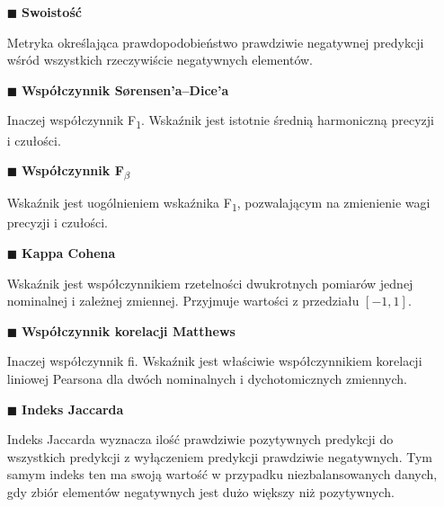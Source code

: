 \begin{itemize}
    \item[$\blacksquare$] \textbf{Swoistość} 
    \par Metryka określająca prawdopodobieństwo prawdziwie negatywnej predykcji wśród wszystkich rzeczywiście negatywnych elementów.
    \par
    
    \item[$\blacksquare$] \textbf{Współczynnik Sørensen'a–Dice'a}
    \par Inaczej współczynnik F\textsubscript{1}. Wskaźnik jest istotnie średnią harmoniczną precyzji i czułości.  
    \par

    \item[$\blacksquare$] \textbf{Współczynnik F\textsubscript{$\beta$}}
    \par Wskaźnik jest uogólnieniem wskaźnika F\textsubscript{1}, pozwalającym na zmienienie wagi precyzji i czułości.
    \par

    \item[$\blacksquare$] \textbf{Kappa Cohena}
    \par Wskaźnik jest współczynnikiem rzetelności dwukrotnych pomiarów jednej nominalnej i zależnej zmiennej. Przyjmuje wartości z przedziału $[-1,1]$.
    \par

    \item[$\blacksquare$] \textbf{Współczynnik korelacji Matthews} 
    \par Inaczej współczynnik fi. Wskaźnik jest właściwie współczynnikiem korelacji liniowej Pearsona dla dwóch nominalnych i dychotomicznych zmiennych. 
    \par

    \item[$\blacksquare$] \textbf{Indeks Jaccarda}
    \par Indeks Jaccarda wyznacza ilość prawdziwie pozytywnych predykcji do wszystkich predykcji z wyłączeniem predykcji prawdziwie negatywnych. Tym samym indeks ten ma swoją wartość w przypadku niezbalansowanych danych, gdy zbiór elementów negatywnych jest dużo większy niż pozytywnych. 
    \par


\end{itemize}
